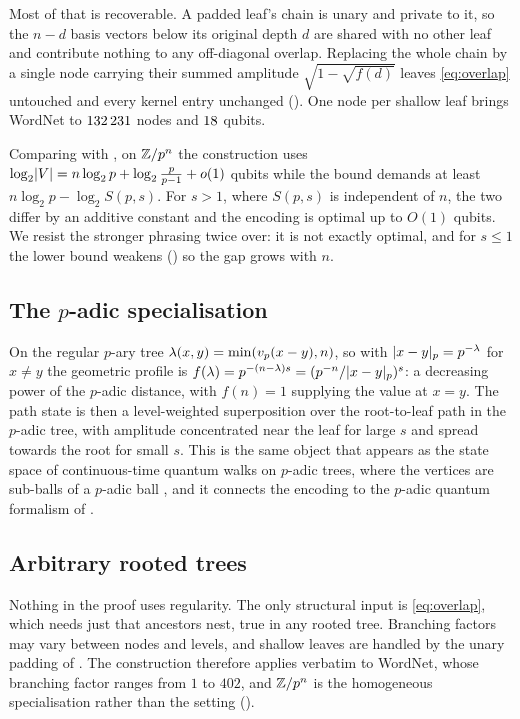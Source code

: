 Most of that is recoverable. A padded leaf's chain is unary and private to it, so the
$n - d$ basis vectors below its original depth $d$ are shared with no other leaf and
contribute nothing to any off-diagonal overlap. Replacing the whole chain by a single
node carrying their summed amplitude $\sqrt{1 - \sqrt{f(d)}}$ leaves
\cref{eq:overlap} untouched and every kernel entry unchanged
(). One node per shallow
leaf brings WordNet to $132\,231$ nodes and $18$ qubits.

Comparing with , on $\mathbb{Z}/p^{n}$ the construction uses
$\log_2 \lvert V\rvert = n \log_2 p + \log_2 \frac{p}{p-1} + o(1)$ qubits while the bound
demands at least $n \log_2 p - \log_2 S(p,s)$. For $s > 1$, where $S(p,s)$ is
independent of $n$, the two differ by an additive constant and the encoding is optimal
up to $O(1)$ qubits. We resist the stronger phrasing twice over: it is not exactly
optimal, and for $s \le 1$ the lower bound weakens () so the
gap grows with $n$.

\subsection{The $p$-adic specialisation}
\label{subsec:padic-specialisation}

On the regular $p$-ary tree $\lambda(x,y) = \min(v_p(x-y), n)$, so with
$\lvert x-y\rvert_p = p^{-\lambda}$ for $x \ne y$ the geometric profile is
$f(\lambda) = p^{-(n-\lambda)s} = ( p^{-n} / \lvert x-y\rvert_p )^{s}$: a decreasing power
of the $p$-adic distance, with $f(n) = 1$ supplying the value at $x = y$. The path state is then a level-weighted superposition over the
root-to-leaf path in the $p$-adic tree, with amplitude concentrated near the leaf for
large $s$ and spread towards the root for small $s$. This is the same object that
appears as the state space of continuous-time quantum walks on $p$-adic trees, where
the vertices are sub-balls of a $p$-adic ball
\citep{ZunigaGalindo2024QuantumWalks,ZunigaGalindo2025TwoAdic}, and it connects the
encoding to the $p$-adic quantum formalism of \citet{AnielloEtAl2023PadicQubit}.

\subsection{Arbitrary rooted trees}
\label{subsec:general-trees}

Nothing in the proof uses regularity. The only structural input is \cref{eq:overlap},
which needs just that ancestors nest, true in any rooted tree. Branching factors may
vary between nodes and levels, and shallow leaves are handled by the unary padding of
. The construction therefore applies verbatim to WordNet, whose
branching factor ranges from $1$ to $402$, and $\mathbb{Z}/p^{n}$ is the homogeneous specialisation
rather than the setting
().

